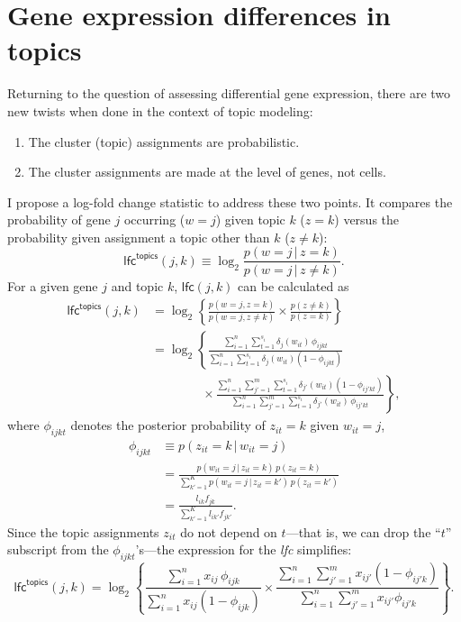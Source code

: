 \documentclass[final]{siamart171218}
\begin{document}
\section{Gene expression differences in topics}

Returning to the question of assessing differential gene expression,
there are two new twists when done in the context of topic modeling:
\begin{enumerate}
  
\item The cluster (topic) assignments are probabilistic.

\item The cluster assignments are made at the level of genes, not
  cells.

\end{enumerate}
I propose a log-fold change statistic to address these two points. It
compares the probability of gene $j$ occurring ($w = j$) given topic
$k$ ($z = k$) versus the probability given assignment a topic other
than $k$ ($z \neq k$):
\begin{equation}
\mathsf{lfc}^{\mathsf{topics}}(j,k) \equiv
\log_2 \frac{p(w = j \,|\, z = k)}
            {p(w = j \,|\, z \neq k)}.
\end{equation}
For a given gene $j$ and topic $k$, $\mathsf{lfc}(j,k)$ can be
calculated as
\begin{align}
\mathsf{lfc}^{\mathsf{topics}}(j,k) &=
\log_2 \left\{ \frac{p(w = j, z = k)}
                    {p(w = j, z \neq k)} \times
               \frac{p(z \neq k)}{p(z = k)} \right\} \nonumber \\
&= \log_2 \left\{ 
\frac{\sum_{i=1}^n \sum_{t=1}^{s_i} \delta_j(w_{it}) \, \phi_{ijkt}}
     {\sum_{i=1}^n \sum_{t=1}^{s_i} \delta_j(w_{it}) (1 - \phi_{ijkt})}
\right. \nonumber \\ 
& \qquad \qquad \times \left. \frac{\sum_{i=1}^n \sum_{j'=1}^m \sum_{t=1}^{s_i} 
             \delta_{j'}(w_{it}) (1-\phi_{ij'kt})}
            {\sum_{i=1}^n \sum_{j'=1}^m \sum_{t=1}^{s_i} \delta_{j'}(w_{it}) 
             \, \phi_{ij'kt}} \right\},
\label{eq:lfc-topic}
\end{align}
where $\phi_{ijkt}$ denotes the posterior probability of $z_{it} = k$
given $w_{it} = j$,
\begin{align}
\phi_{ijkt} &\equiv p(z_{it} = k \,|\, w_{it} = j) \nonumber \\
&= \frac{p(w_{it} = j \,|\, z_{it} = k) \, p(z_{it} = k)}
        {\sum_{k'=1}^K p(w_{it} = j \,|\, z_{it} = k') \, p(z_{it} = k')} 
   \nonumber \\
&= \frac{l_{ik} f_{jk}}
        {\sum_{k'=1}^K l_{ik'} f_{jk'}}.
\end{align}
Since the topic assignments $z_{it}$ do not depend on $t$---that is,
we can drop the ``$t$'' subscript from the $\phi_{ijkt}$'s---the expression
for the {\em lfc} simplifies:
\begin{equation}
\mathsf{lfc}^{\mathsf{topics}}(j,k) = \log_2 \left\{ 
\frac{\sum_{i=1}^n x_{ij} \, \phi_{ijk}}
     {\sum_{i=1}^n x_{ij} (1 - \phi_{ijk})}
     \times \frac{\sum_{i=1}^n \sum_{j'=1}^m x_{ij'} (1-\phi_{ij'k})}
                 {\sum_{i=1}^n \sum_{j'=1}^m x_{ij'} \phi_{ij'k}} \right\}.
\end{equation}
\end{document}
